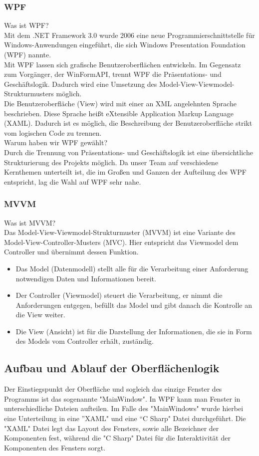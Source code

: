 \documentclass[12pt,a4paper,headinclude,twoside, plainheadsepline, open=right,numbers=noenddot]{scrreprt}
\begin{document}
\subsubsection{WPF}
Was ist WPF? \\
Mit dem .NET Framework 3.0 wurde 2006 eine neue Programmierschnittstelle für Windows-Anwendungen eingeführt, die sich Windows Presentation Foundation (WPF) nannte. \\
Mit WPF lassen sich grafische Benutzeroberflächen entwickeln. Im Gegensatz zum Vorgänger, der WinFormAPI, trennt WPF die Präsentations- und Geschäftslogik. Dadurch wird eine Umsetzung des Model-View-Viewmodel-Strukturmusters möglich.  \\
Die Benutzeroberfläche (View) wird mit einer an XML angelehnten Sprache beschrieben. Diese Sprache heißt eXtensible Application Markup Language (XAML). Dadurch ist es möglich, die Beschreibung der Benutzeroberfläche strikt vom logischen Code zu trennen\cite{Kühnel}. \\
Warum haben wir WPF gewählt? \\
Durch die Trennung von Präsentations- und Geschäftslogik ist eine übersichtliche Strukturierung des Projekts möglich. Da unser Team auf verschiedene Kernthemen unterteilt ist, die im Großen und Ganzen der Aufteilung des WPF entspricht, lag die Wahl auf WPF sehr nahe.

\subsubsection{MVVM}
Was ist MVVM? \\
Das Model-View-Viewmodel-Strukturmuster (MVVM) ist eine Variante des Model-View-Controller-Musters (MVC). Hier entspricht das Viewmodel dem Controller und übernimmt dessen Funktion. \\
\begin{itemize}
\item Das Model (Datenmodell) stellt alle für die Verarbeitung einer Anforderung notwendigen Daten und Informationen bereit.
\item Der Controller (Viewmodel) steuert die Verarbeitung, er nimmt die Anforderungen entgegen, befüllt das Model und gibt danach die Kontrolle an die View weiter.
\item Die View (Ansicht) ist für die Darstellung der Informationen, die sie in Form des Models vom Controller erhält, zuständig\cite{Kühnel}.
\end{itemize}

\subsection{Aufbau und Ablauf der Oberflächenlogik}
Der Einstiegspunkt der Oberfläche und sogleich das einzige Fenster des Programms ist das sogenannte "{}MainWindow"{}. In WPF kann man Fenster in unterschiedliche Dateien aufteilen. Im Falle des "{}MainWindows"{} wurde hierbei eine Unterteilung in eine ”{}XAML"{} und eine “{}C Sharp"{} Datei durchgeführt. Die "{}XAML"{} Datei legt das Layout des Fensters, sowie alle Bezeichner der Komponenten fest, während die "{}C Sharp"{} Datei für die Interaktivität der Komponenten des Fensters sorgt. 
\end{document}
